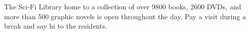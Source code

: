 The Sci-Fi Library \textemdash{} home to a collection of over 9800
books, 2600 DVDs, and more than 500 graphic novels
\textemdash{} is open throughout the day. Pay a visit during a break
and say hi to the residents.
